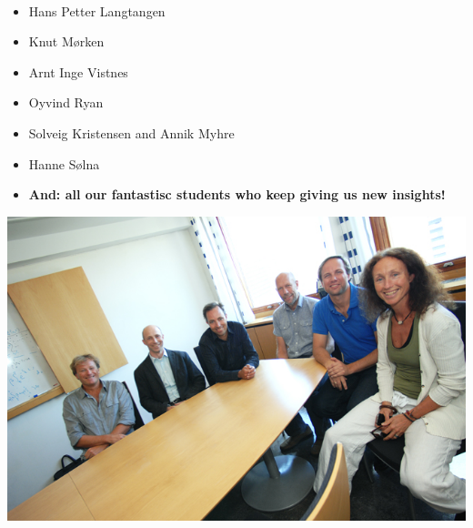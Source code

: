 \documentclass[%
twoside,                 %
final,                   %
10pt]{article}
\begin{document}
\paragraph{}
\begin{itemize}
\item Hans Petter Langtangen

\item Knut Mørken

\item Arnt Inge Vistnes

\item Oyvind Ryan

\item Solveig Kristensen and Annik Myhre

\item Hanne Sølna

\item \textbf{And: all our fantastisc students who keep giving us new insights!}
\end{itemize}

\noindent





\centerline{\includegraphics[width=1.0\linewidth]{fig-future/thegang.jpg}}











\printindex
\end{document}
